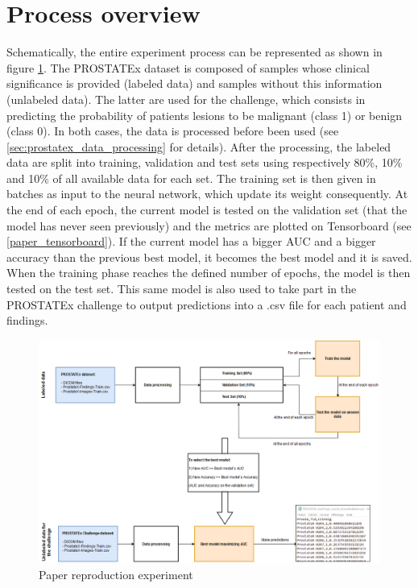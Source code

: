 \section{Process overview}
Schematically, the entire experiment process can be represented as shown in figure \ref{fig:paper_reproduction_process}. The PROSTATEx dataset is composed of samples whose clinical significance is provided (labeled data) and samples without this information (unlabeled data). The latter are used for the challenge, which consists in predicting the probability of patients lesions to be malignant (class 1) or benign (class 0). In both cases, the data is processed before been used (see \ref{sec:prostatex_data_processing} for details). After the processing, the labeled data are split into training, validation and test sets using respectively 80\%, 10\% and 10\% of all available data for each set. The training set is then given in batches as input to the neural network, which update its weight consequently. At the end of each epoch, the current model is tested on the validation set (that the model has never seen previously) and the metrics are plotted on Tensorboard (see \ref{paper_tensorboard}). If the current model has a bigger AUC and a bigger accuracy than the previous best model, it becomes the best model and it is saved.  When the training phase reaches the defined number of epochs, the model is then tested on the test set. This same model is also used to take part in the PROSTATEx challenge to output predictions into a .csv file for each patient and findings.

\begin{figure}[!h]
\centering
\includegraphics[width=1\textwidth, keepaspectratio=true]{./figures/paper_reproduction_process.png}
\caption{Paper reproduction experiment}
\label{fig:paper_reproduction_process}
\end{figure}


